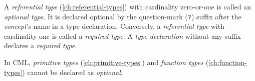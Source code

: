 A \emph{referential type} (\ref{ch:referential-types})
with cardinality zero-or-one is called an \emph{optional type}.
It is declared optional by the question-mark (\verb|?|) suffix
after the \emph{concept}'s name in a type declaration.
Conversely, a \emph{referential type} with cardinality one
is called a \emph{required type}.
A \emph{type declaration} without any suffix declares a \emph{required type}.

In CML, \emph{primitive types} (\ref{ch:primitive-types})
and \emph{function types} (\ref{ch:function-types})
cannot be declared as \emph{optional}.
